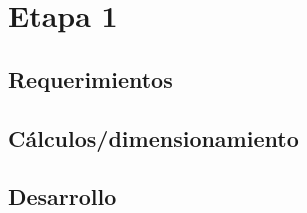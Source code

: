 \lipsum[0-3]

\section{Etapa 1}
\lipsum[0-1]

\subsection{Requerimientos}

\lipsum[0-2]

\subsection{C\'alculos/dimensionamiento}

\subsection{Desarrollo }
\lipsum[0-1]

